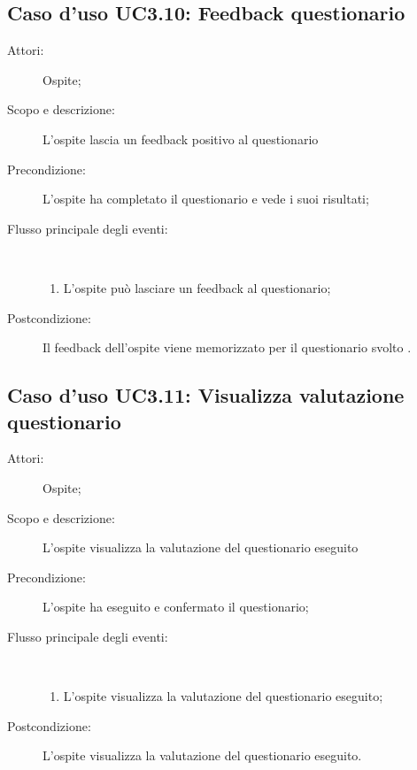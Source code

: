 \subsection{Caso d'uso UC3.10: Feedback questionario}\begin{description}
	\item[Attori:] Ospite;
	\item[Scopo e descrizione:] L'ospite lascia un feedback positivo al questionario
	\item[Precondizione:] L'ospite ha completato il questionario e vede i suoi risultati;
	
	\item[Flusso principale degli eventi:] \ 
	\begin{enumerate}
		\item L'ospite può lasciare un feedback al questionario;
		
	\end{enumerate}
	\item[Postcondizione:] Il feedback dell'ospite viene memorizzato per il questionario svolto .
\end{description}
\hypertarget{UC3.11}{}
\subsection{Caso d'uso UC3.11: Visualizza valutazione questionario}\begin{description}
	\item[Attori:] Ospite;
	\item[Scopo e descrizione:] L'ospite visualizza la valutazione del questionario eseguito
	\item[Precondizione:] L'ospite ha eseguito e confermato il questionario;
	
	\item[Flusso principale degli eventi:] \ 
	\begin{enumerate}
		\item L'ospite visualizza la valutazione del questionario eseguito;
		
	\end{enumerate}
	\item[Postcondizione:] L'ospite visualizza la valutazione del questionario eseguito.
\end{description}
\hypertarget{UC4}{}

